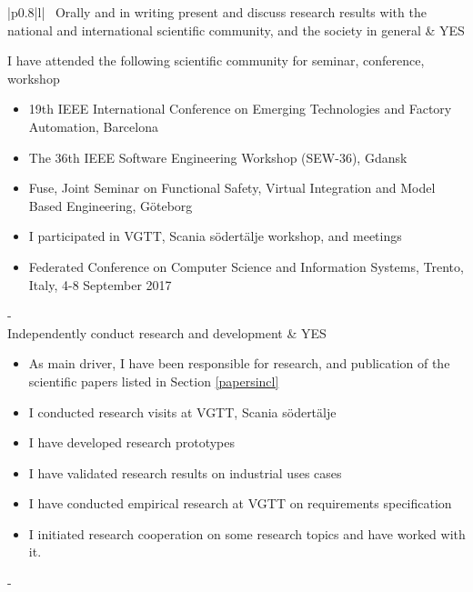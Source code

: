 \begin{longtable}{|p{0.8\linewidth}|l|}
  ~Orally and in writing present and discuss research results with the national and international scientific community, and the society in general & YES\\
  \hline {}
  \begin{minipage}{\linewidth}\vspace{0.2cm}
  I have attended the following scientific community for seminar, conference, workshop
    \begin{itemize} \itemsep-0.25em
    \item 19th IEEE International Conference on Emerging Technologies and Factory Automation, Barcelona
    \item The 36th IEEE Software Engineering Workshop (SEW-36), Gdansk
    \item Fuse, Joint Seminar on Functional Safety, Virtual Integration and Model Based Engineering, G\"oteborg
    \item I participated in VGTT, Scania s\"odert\"alje workshop, and meetings
    \item Federated Conference on Computer Science and Information Systems, Trento, Italy, 4-8 September 2017
  \end{itemize}
  \end{minipage}\hfill\vline\kern-\arrayrulewidth\\

   Independently conduct research and development & YES\\
  \hline {}
  \begin{minipage}{\linewidth}\vspace{0.2cm}
    \begin{itemize} \itemsep-0.25em
    \item As main driver, I have been responsible for research, and publication of the scientific papers listed in Section \ref{papersincl}
    \item I conducted research visits at VGTT, Scania s\"odert\"alje
    \item I have developed research prototypes
    \item I have validated research results on industrial uses cases
    \item I have conducted empirical research at VGTT on requirements specification
    \item I initiated research cooperation on some research topics and have worked with it.
  \end{itemize}
  \end{minipage}\hfill\vline\kern-\arrayrulewidth\\
\hline
\end{longtable}

